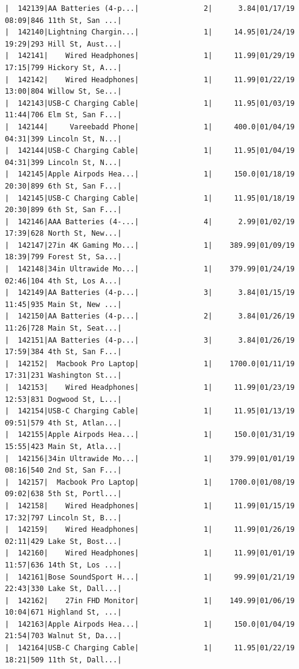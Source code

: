 \documentclass[
  letterpaper,
  DIV=11,
  numbers=noendperiod]{scrartcl}
\begin{document}
\begin{verbatim}
|  142139|AA Batteries (4-p...|               2|      3.84|01/17/19 08:09|846 11th St, San ...|
|  142140|Lightning Chargin...|               1|     14.95|01/24/19 19:29|293 Hill St, Aust...|
|  142141|    Wired Headphones|               1|     11.99|01/29/19 17:15|799 Hickory St, A...|
|  142142|    Wired Headphones|               1|     11.99|01/22/19 13:00|804 Willow St, Se...|
|  142143|USB-C Charging Cable|               1|     11.95|01/03/19 11:44|706 Elm St, San F...|
|  142144|     Vareebadd Phone|               1|     400.0|01/04/19 04:31|399 Lincoln St, N...|
|  142144|USB-C Charging Cable|               1|     11.95|01/04/19 04:31|399 Lincoln St, N...|
|  142145|Apple Airpods Hea...|               1|     150.0|01/18/19 20:30|899 6th St, San F...|
|  142145|USB-C Charging Cable|               1|     11.95|01/18/19 20:30|899 6th St, San F...|
|  142146|AAA Batteries (4-...|               4|      2.99|01/02/19 17:39|628 North St, New...|
|  142147|27in 4K Gaming Mo...|               1|    389.99|01/09/19 18:39|799 Forest St, Sa...|
|  142148|34in Ultrawide Mo...|               1|    379.99|01/24/19 02:46|104 4th St, Los A...|
|  142149|AA Batteries (4-p...|               3|      3.84|01/15/19 11:45|935 Main St, New ...|
|  142150|AA Batteries (4-p...|               2|      3.84|01/26/19 11:26|728 Main St, Seat...|
|  142151|AA Batteries (4-p...|               3|      3.84|01/26/19 17:59|384 4th St, San F...|
|  142152|  Macbook Pro Laptop|               1|    1700.0|01/11/19 17:31|231 Washington St...|
|  142153|    Wired Headphones|               1|     11.99|01/23/19 12:53|831 Dogwood St, L...|
|  142154|USB-C Charging Cable|               1|     11.95|01/13/19 09:51|579 4th St, Atlan...|
|  142155|Apple Airpods Hea...|               1|     150.0|01/31/19 15:55|423 Main St, Atla...|
|  142156|34in Ultrawide Mo...|               1|    379.99|01/01/19 08:16|540 2nd St, San F...|
|  142157|  Macbook Pro Laptop|               1|    1700.0|01/08/19 09:02|638 5th St, Portl...|
|  142158|    Wired Headphones|               1|     11.99|01/15/19 17:32|797 Lincoln St, B...|
|  142159|    Wired Headphones|               1|     11.99|01/26/19 02:11|429 Lake St, Bost...|
|  142160|    Wired Headphones|               1|     11.99|01/01/19 11:57|636 14th St, Los ...|
|  142161|Bose SoundSport H...|               1|     99.99|01/21/19 22:43|330 Lake St, Dall...|
|  142162|    27in FHD Monitor|               1|    149.99|01/06/19 10:04|671 Highland St, ...|
|  142163|Apple Airpods Hea...|               1|     150.0|01/04/19 21:54|703 Walnut St, Da...|
|  142164|USB-C Charging Cable|               1|     11.95|01/22/19 18:21|509 11th St, Dall...|

\end{verbatim}
\end{document}
